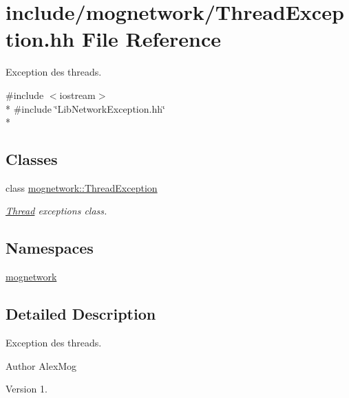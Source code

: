 \hypertarget{_thread_exception_8hh}{\section{include/mognetwork/\-Thread\-Exception.hh File Reference}
\label{_thread_exception_8hh}
}


Exception des threads.  


{\ttfamily \#include $<$iostream$>$}\\*
{\ttfamily \#include \char`\"{}Lib\-Network\-Exception.\-hh\char`\"{}}\\*
\subsection*{Classes}
\begin{DoxyCompactItemize}
\item 
class \hyperlink{classmognetwork_1_1_thread_exception}{mognetwork\-::\-Thread\-Exception}
\begin{DoxyCompactList}\small\item\em \hyperlink{classmognetwork_1_1_thread}{Thread} exceptions class. \end{DoxyCompactList}\end{DoxyCompactItemize}
\subsection*{Namespaces}
\begin{DoxyCompactItemize}
\item 
\hyperlink{namespacemognetwork}{mognetwork}
\end{DoxyCompactItemize}


\subsection{Detailed Description}
Exception des threads. \begin{DoxyAuthor}{Author}
Alex\-Mog 
\end{DoxyAuthor}
\begin{DoxyVersion}{Version}
1. 
\end{DoxyVersion}
